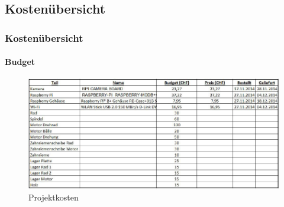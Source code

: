 \subsection{Kostenübersicht}
\begin{frame}
	\frametitle{Kostenübersicht\hfill{}\footnotesize \group}
	\framesubtitle{Budget}
	
	\begin{figure}
		\centering
		\includegraphics[width=1\textwidth]{../../fig/projektkosten.png}
		\caption{Projektkosten}
	\end{figure}
	
	
\end{frame}
